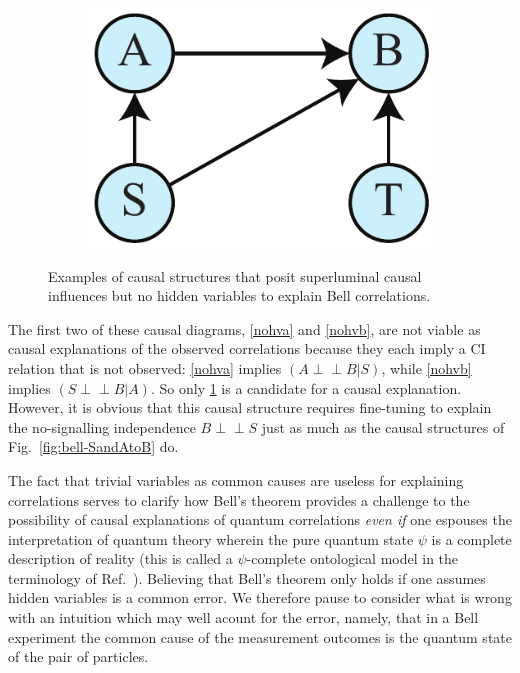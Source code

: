 \documentclass[letterpaper,onecolumn,nofootinbib]{revtex4}
\def\indep{\perp\!\!\!\!\perp}
\begin{document}
\begin{figure}[h]
\begin{subfigure}[b]{0.18\textwidth}
                	\includegraphics[width=\textwidth]{bell-gen-AB}
		\subcaption{}
			\label{nohvc}
	\end{subfigure}
 \caption{Examples of causal structures that posit superluminal causal influences but no hidden variables to explain Bell correlations.}
\label{fig:bellnohv-SandAtoB}
\end{figure}

The first two of these causal diagrams, \ref{nohva} and \ref{nohvb}, are not viable as causal explanations of the observed correlations because they each imply a CI relation that is not observed:  \ref{nohva} implies $\left( A \indep B|S\right)$, while \ref{nohvb} implies $\left( S \indep B|A \right)$.  So only \ref{nohvc} is a candidate for a causal explanation.  However, it is obvious that this causal structure requires fine-tuning to explain the no-signalling independence $B \indep S$ just as much as the causal structures of Fig.~\ref{fig:bell-SandAtoB} do.   


The fact that trivial variables as common causes are useless for explaining correlations
serves to clarify how Bell's theorem provides a challenge to the possibility of causal explanations of quantum correlations  
{\em even if} one espouses the interpretation of quantum theory wherein the pure quantum state $\psi$ is a complete description of reality (this is called a $\psi$-complete ontological model in the terminology of Ref.~\cite{Harrigan2010}).  Believing that Bell's theorem only holds if one assumes hidden variables is a common error.  We therefore pause to consider what is wrong with an intuition which may well acount for the error, namely, that in a Bell experiment the common cause of the measurement outcomes is the quantum state of the pair of particles.  
\end{document}
